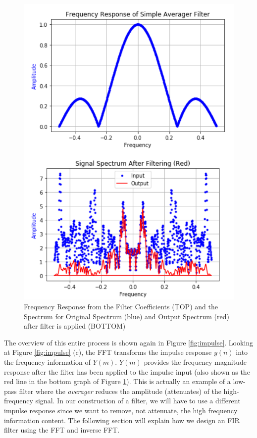 \begin{figure}[h!]
	\centering
	\includegraphics[scale = .8]{example_spectrum.png} %
	\caption{Frequency Response from the Filter Coefficients (TOP) and the Spectrum for Original Spectrum (blue) and Output Spectrum (red) after filter is applied (BOTTOM)}
	\label{fig:exspec}
\end{figure}    

The overview of this entire process is shown again in Figure \ref{fig:impulse}.  Looking at Figure \ref{fig:impulse} (c), the FFT transforms the impulse response $y(n)$ into the frequency information of $Y(m)$.  $Y(m)$ provides the frequency magnitude response after the filter has been applied to the impulse input (also shown as the red line in the bottom graph of Figure \ref{fig:exspec}).  This is actually an example of a low-pass filter where the \textit{averager} reduces the amplitude (attenuates) of the high-frequency  signal.  In our construction of a filter, we will have to use a different impulse response since we want to remove, not attenuate, the high frequency information content.  The following section will explain how we design an FIR filter using the FFT and inverse FFT.

